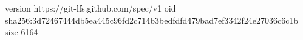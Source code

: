 version https://git-lfs.github.com/spec/v1
oid sha256:3d72467444db5ea445c96fd2c714b3bedfdfd479bad7ef3342f24e27036c6c1b
size 6164
